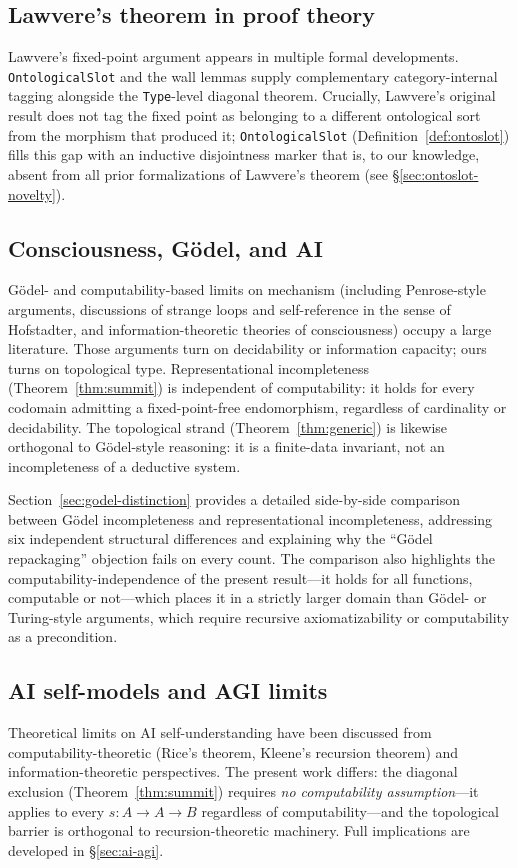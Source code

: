 \documentclass[11pt]{article}
\begin{document}
\subsection{Lawvere's theorem in proof theory}
Lawvere's fixed-point argument appears in multiple formal developments.
\texttt{OntologicalSlot} and the wall lemmas supply complementary
category-internal tagging alongside the \texttt{Type}-level diagonal
theorem.  Crucially, Lawvere's original result does not tag the fixed
point as belonging to a different ontological sort from the morphism
that produced it; \texttt{OntologicalSlot}
(Definition~\ref{def:ontoslot}) fills this gap with an inductive
disjointness marker that is, to our knowledge, absent from all prior
formalizations of Lawvere's theorem
(see \S\ref{sec:ontoslot-novelty}).

\subsection{Consciousness, G\"odel, and AI}
G\"odel- and computability-based limits on mechanism (including Penrose-style
arguments, discussions of strange loops and self-reference in the sense of
Hofstadter, and information-theoretic theories of
consciousness) occupy a large literature.  Those arguments turn on
decidability or information capacity; ours turns on topological type.
Representational incompleteness (Theorem~\ref{thm:summit}) is
independent of computability: it holds for every codomain admitting a
fixed-point-free endomorphism, regardless of cardinality or
decidability.  The topological strand
(Theorem~\ref{thm:generic}) is likewise orthogonal to G\"odel-style
reasoning: it is a finite-data invariant, not an incompleteness of a
deductive system.

Section~\ref{sec:godel-distinction} provides a detailed side-by-side
comparison between G\"odel incompleteness and representational
incompleteness, addressing six independent structural differences and
explaining why the ``G\"odel repackaging'' objection fails on every
count.  The comparison also highlights the computability-independence
of the present result---it holds for all functions, computable or
not---which places it in a strictly larger domain than G\"odel- or
Turing-style arguments, which require recursive axiomatizability or
computability as a precondition.

\subsection{AI self-models and AGI limits}
Theoretical limits on AI self-understanding have been discussed from
computability-theoretic (Rice's theorem, Kleene's recursion theorem)
and information-theoretic perspectives.  The present work differs:
the diagonal exclusion (Theorem~\ref{thm:summit}) requires \emph{no
computability assumption}---it applies to every
$s : A \!\to\! A \!\to\! B$ regardless of computability---and the
topological barrier is orthogonal to recursion-theoretic machinery.
Full implications are developed in \S\ref{sec:ai-agi}.
\end{document}
